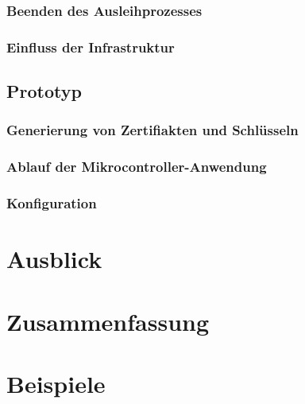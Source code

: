 \documentclass[doktyp=barbeit]{TUBAFarbeiten}
\begin{document}
		\subsubsection{Beenden des Ausleihprozesses}
			\label{sec: impl beenden des ausleihprozesses}
			

		\subsubsection{Einfluss der Infrastruktur}
			\label{sec: impl einfluss der infrastruktur}
			

	\subsection{Prototyp}
		
		\subsubsection{Generierung von Zertifiakten und Schlüsseln}
			

		\subsubsection{Ablauf der Mikrocontroller-Anwendung}

		\subsubsection{Konfiguration}

\newpage
\section{Ausblick}
	

\newpage
\section{Zusammenfassung}
	

\newpage
\printbibliography[heading=bibintoc]

\newpage
\appendix

\section{Beispiele}
\end{document}
